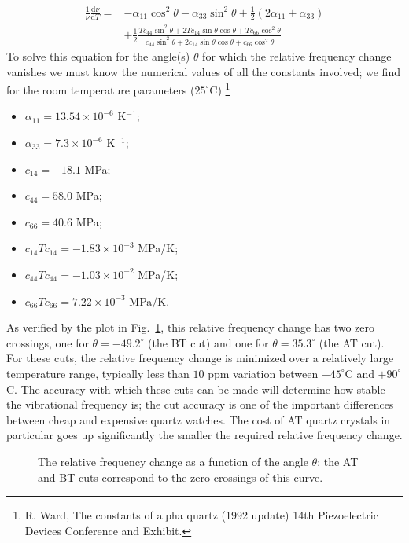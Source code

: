 \begin{align*}
	\frac{1}{\nu}\frac{\mathrm{d}\nu}{\mathrm{d}T} =& - \alpha_{11}\cos^2\theta-\alpha_{33}\sin^2\theta +\frac{1}{2}(2\alpha_{11}+\alpha_{33})\\
	& + \frac{1}{2}\frac{T\!c_{44}\sin^2\theta + 2T\!c_{14}\sin\theta\cos\theta + T\!c_{66}\cos^2\theta}{c_{44}\sin^2\theta + 2c_{14}\sin\theta\cos\theta + c_{66}\cos^2\theta}
\end{align*}
To solve this equation for the angle(s) $\theta$ for which the relative frequency change vanishes we must know the numerical values of all the constants involved; we find for the room temperature parameters ($25^{\circ}$C) \footnote{R. Ward, The constants of alpha quartz (1992 update) 14th Piezoelectric Devices Conference and Exhibit.}
\begin{itemize}
	\item $\alpha_{11} = 13.54\times10^{-6}$ K$^{-1}$;
	\item $\alpha_{33} = 7.3\times10^{-6}$ K$^{-1}$;
	\item $c_{14} = -18.1$ MPa;
	\item $c_{44} = 58.0$ MPa;
	\item $c_{66} = 40.6$ MPa;
	\item $c_{14}T\!c_{14} = -1.83\times 10^{-3}$ MPa/K;
	\item $c_{44}T\!c_{44} = -1.03\times 10^{-2}$ MPa/K;
	\item $c_{66}T\!c_{66} = 7.22\times 10^{-3}$ MPa/K.
\end{itemize}
As verified by the plot in Fig.~\ref{\chabbr:fig:roots}, this relative frequency change has two zero crossings, one for $\theta=-49.2^{\circ}$ (the BT cut) and one for $\theta=35.3^{\circ}$ (the AT cut).  For these cuts, the relative frequency change is minimized over a relatively large temperature range, typically less than $10$ ppm variation between $-45^{\circ}$C and $+90^{\circ}$C.  The accuracy with which these cuts can be made will determine how stable the vibrational frequency is; the cut accuracy is one of the important differences between cheap and expensive quartz watches.  The cost of AT quartz crystals in particular goes up significantly the smaller the required relative frequency change.

\begin{figure}[t]
\centering\leavevmode
\caption{\label{\chabbr:fig:roots}The relative frequency change as a function of the angle $\theta$; the AT and BT cuts correspond to the zero crossings of this curve.}
\end{figure}

